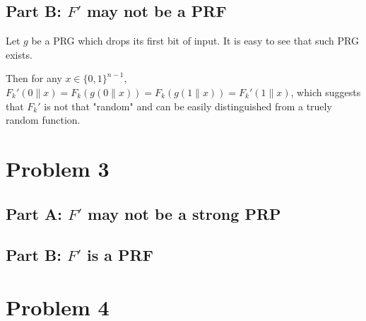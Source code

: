\documentclass[8pt]{article}
\theoremstyle{compact}
\begin{document}
\subsection*{Part B: $F'$ may not be a PRF}
Let $g$ be a PRG which drops its first bit of input. It is easy to see that such PRG exists.

Then for any $x \in \{0, 1\}^{n-1}$, $F_k'(0 \| x) = F_k(g(0\|x)) = F_k(g(1\|x)) = F_k'(1\|x)$, which suggests that $F_k'$ is not that "random" and can be easily distinguished from a truely random function.

\section*{Problem 3}
\subsection*{Part A: $F'$ may not be a strong PRP}
\subsection*{Part B: $F'$ is a PRF}

\section*{Problem 4}
\end{document}
